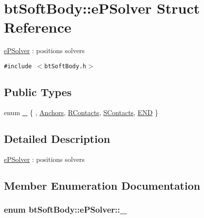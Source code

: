 \hypertarget{structbt_soft_body_1_1e_p_solver}{
\section{btSoftBody::ePSolver Struct Reference}
\label{structbt_soft_body_1_1e_p_solver}
}
\hyperlink{structbt_soft_body_1_1e_p_solver}{ePSolver} : positions solvers  


{\tt \#include $<$btSoftBody.h$>$}

\subsection*{Public Types}
\begin{CompactItemize}
\item 
enum \hyperlink{structbt_soft_body_1_1e_p_solver_5d6ab41a09da7333bc2047b4ea14bf86}{\_\-} \{ , \hyperlink{structbt_soft_body_1_1e_p_solver_5d6ab41a09da7333bc2047b4ea14bf86d1de203597e3f891a95c3aaf4f805e84}{Anchors}, 
\hyperlink{structbt_soft_body_1_1e_p_solver_5d6ab41a09da7333bc2047b4ea14bf8618826149c80118f73e906b4966c69891}{RContacts}, 
\hyperlink{structbt_soft_body_1_1e_p_solver_5d6ab41a09da7333bc2047b4ea14bf861ff50fff0983fbc2e4ae19997d7bfb4e}{SContacts}, 
\hyperlink{structbt_soft_body_1_1e_p_solver_5d6ab41a09da7333bc2047b4ea14bf86f5b5c91f8cb6d3d29ee7bb11e1ce5610}{END}
 \}
\end{CompactItemize}


\subsection{Detailed Description}
\hyperlink{structbt_soft_body_1_1e_p_solver}{ePSolver} : positions solvers 

\subsection{Member Enumeration Documentation}
\hypertarget{structbt_soft_body_1_1e_p_solver_5d6ab41a09da7333bc2047b4ea14bf86}{
\subsubsection[\_\-]{\setlength{\rightskip}{0pt plus 5cm}enum {\bf btSoftBody::ePSolver::\_\-}}}
\label{structbt_soft_body_1_1e_p_solver_5d6ab41a09da7333bc2047b4ea14bf86}


